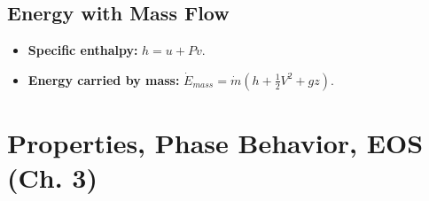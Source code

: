 \documentclass[10pt]{article}
\begin{document}
\begin{multicols}{2}
\subsection{Energy with Mass Flow}
\begin{itemize}
    \item \textbf{Specific enthalpy:} $h = u + P v$.
    \item \textbf{Energy carried by mass:} $\dot E_{mass} = \dot m\!\left(h + \tfrac12 V^2 + gz\right)$.
\end{itemize}

\end{multicols}
\section{Properties, Phase Behavior, EOS (Ch. 3)}
\end{document}
